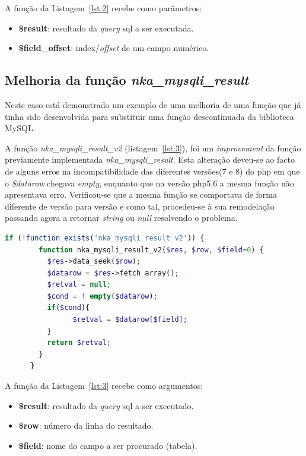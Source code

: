 A função da Listagem~\ref{lst:2} recebe como parâmetros:
\begin{itemize}
  \item \textbf{\$result}: resultado da \textit{query} \acrshort{sql} a ser executada.
  \item \textbf{\$field\_offset}: index/\textit{offset} de um campo numérico.
\end{itemize}


\subsection{Melhoria da função \textit{nka\_mysqli\_result}}

Neste caso está demonstrado um exemplo de uma melhoria de uma função que já tinha sido desenvolvida para substituir uma função descontinuada da biblioteca MySQL.

A função \textit{nka\_mysqli\_result\_v2} (listagem~\ref{lst:3}), foi um \textit{improvement} da função previamente implementada \textit{nka\_mysqli\_result}. Esta alteração deveu-se ao facto de alguns erros na incompatibilidade das diferentes versões(7 e 8) do \acrshort{php} em que o \textit{\$datarow} chegava \textit{empty}, enquanto que na versão \acrshort{php}5.6 a mesma função não apresentava erro. Verificou-se que a mesma função se comportava de forma diferente de versão para versão e como tal, procedeu-se à sua remodelação passando agora a retornar \textit{string} ou \textit{null} resolvendo o problema.


\begin{lstlisting}[language={php},
                   caption={Melhoria da função nka\_mysql\_result.},
                   label=lst:3]
      if (!function_exists('nka_mysqli_result_v2')) {
        function nka_mysqli_result_v2($res, $row, $field=0) {
      	  $res->data_seek($row);
      	  $datarow = $res->fetch_array();
      	  $retval = null;
      	  $cond = ! empty($datarow);
      	  if($cond){
      		    $retval = $datarow[$field];
      	  }
      	  return $retval;
      	}
      }
\end{lstlisting}

A função da Listagem~\ref{lst:3} recebe como argumentos:
\begin{itemize}
  \item \textbf{\$result}: resultado da \textit{query} \acrshort{sql} a ser executado.
  \item \textbf{\$row}: número da linha do resultado.
  \item \textbf{\$field}: nome do campo a ser procurado (tabela).
\end{itemize}



